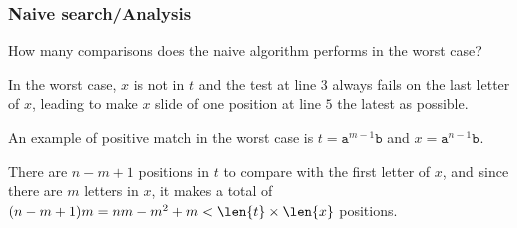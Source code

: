 %
\begin{frame}
\frametitle{Naive search/Analysis}

How many comparisons does the naive algorithm performs in the worst
case?

\bigskip

In the worst case, \(x\) is not in \(t\) and the test at line \(3\)
always fails on the last letter of \(x\), leading to make \(x\)
slide of one position at line \(5\) the latest as possible. 

\bigskip

An example of positive match in the worst case is \(t =
\texttt{a}^{m-1}\texttt{b}\) and \(x = \texttt{a}^{n-1}\texttt{b}\).

\bigskip

There are \(n - m + 1\) positions in \(t\) to compare with the first
letter of \(x\), and since there are \(m\) letters in \(x\), it makes
a total of \((n - m + 1) m = nm - m^2 + m < \len{t} \times \len{x}\)
positions.

\end{frame}

